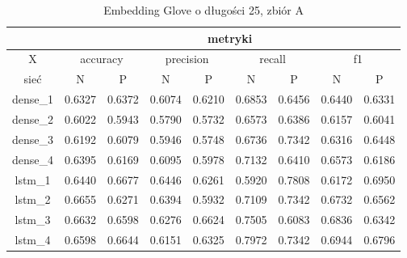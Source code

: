 \begin{table}[p] \label{tab:wyniki_glove_A} \centering
    \caption{Embedding Glove o długości 25, zbiór A}

    \begin{tabular} {|c|c|c|c|c|c|c|c|c| }    \hline
                 & \multicolumn{8}{c|}{metryki}                                                                                                                               \\ \hline
        X        & \multicolumn{2}{c|}{accuracy} & \multicolumn{2}{c|}{precision} & \multicolumn{2}{c|}{recall} & \multicolumn{2}{c|}{f1}                                     \\ \hline
        sieć     & N                             & P                              & N                           & P                       & N      & P      & N      & P      \\ \hline
        dense\_1 & 0.6327                        & 0.6372                         & 0.6074                      & 0.6210                  & 0.6853 & 0.6456 & 0.6440 & 0.6331 \\ \hline
        dense\_2 & 0.6022                        & 0.5943                         & 0.5790                      & 0.5732                  & 0.6573 & 0.6386 & 0.6157 & 0.6041 \\ \hline
        dense\_3 & 0.6192                        & 0.6079                         & 0.5946                      & 0.5748                  & 0.6736 & 0.7342 & 0.6316 & 0.6448 \\ \hline
        dense\_4 & 0.6395                        & 0.6169                         & 0.6095                      & 0.5978                  & 0.7132 & 0.6410 & 0.6573 & 0.6186 \\ \hline
        lstm\_1  & 0.6440                        & 0.6677                         & 0.6446                      & 0.6261                  & 0.5920 & 0.7808 & 0.6172 & 0.6950 \\ \hline
        lstm\_2  & 0.6655                        & 0.6271                         & 0.6394                      & 0.5932                  & 0.7109 & 0.7342 & 0.6732 & 0.6562 \\ \hline
        lstm\_3  & 0.6632                        & 0.6598                         & 0.6276                      & 0.6624                  & 0.7505 & 0.6083 & 0.6836 & 0.6342 \\ \hline
        lstm\_4  & 0.6598                        & 0.6644                         & 0.6151                      & 0.6325                  & 0.7972 & 0.7342 & 0.6944 & 0.6796 \\ \hline

\end{tabular}
\end{table}
